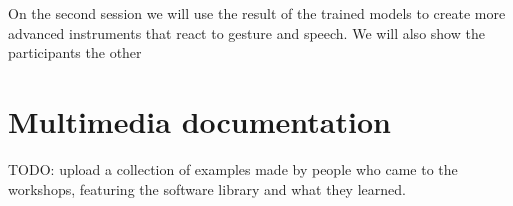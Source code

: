 On the second session we will use the result of the trained models to create more advanced instruments that react to gesture and speech. We will also show the participants the other 
 
\section{Multimedia documentation}

TODO: upload a collection of examples made by people who came to the workshops, featuring the software library and what they learned.
